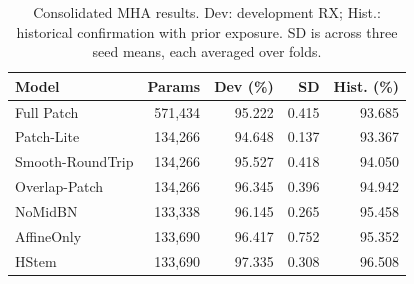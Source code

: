 \begin{table}[t]
\centering\caption{Consolidated MHA results. Dev: development RX; Hist.: historical confirmation with prior exposure. SD is across three seed means, each averaged over folds.}
\label{tab:main}
\setlength{\tabcolsep}{3pt}\footnotesize
\begin{tabular}{lrrrr}
\toprule Model & Params & Dev (\%) & SD & Hist. (\%)\\\midrule
Full Patch & 571,434 & 95.222 & 0.415 & 93.685\\
Patch-Lite & 134,266 & 94.648 & 0.137 & 93.367\\
Smooth-RoundTrip & 134,266 & 95.527 & 0.418 & 94.050\\
Overlap-Patch & 134,266 & 96.345 & 0.396 & 94.942\\
NoMidBN & 133,338 & 96.145 & 0.265 & 95.458\\
AffineOnly & 133,690 & 96.417 & 0.752 & 95.352\\
HStem & 133,690 & 97.335 & 0.308 & 96.508\\
\bottomrule\end{tabular}
\end{table}
